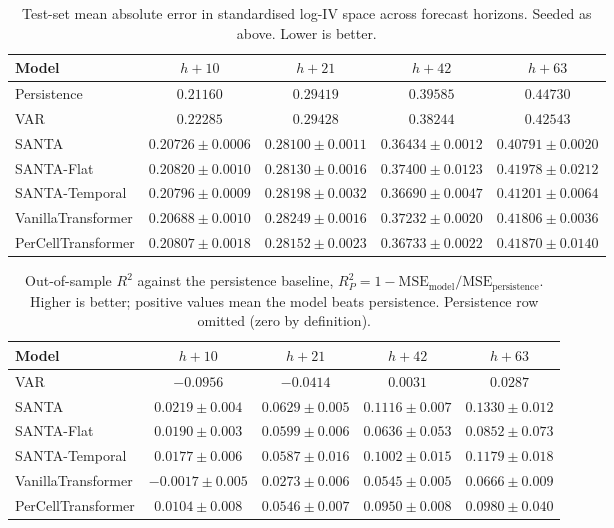 \begin{table}[h]
\centering
\caption{Test-set mean absolute error in standardised log-IV space across forecast horizons. Seeded as above. Lower is better.}
\label{tab:headline_mae}
\begin{tabular}{lcccc}
\toprule
Model & $h{+}10$ & $h{+}21$ & $h{+}42$ & $h{+}63$ \\
\midrule
Persistence            & $0.21160$ & $0.29419$ & $0.39585$ & $0.44730$ \\
VAR                    & $0.22285$ & $0.29428$ & $0.38244$ & $0.42543$ \\
\midrule
SANTA                  & $0.20726 \pm 0.0006$ & $\mathbf{0.28100 \pm 0.0011}$ & $\mathbf{0.36434 \pm 0.0012}$ & $\mathbf{0.40791 \pm 0.0020}$ \\
SANTA-Flat             & $0.20820 \pm 0.0010$ & $0.28130 \pm 0.0016$ & $0.37400 \pm 0.0123$ & $0.41978 \pm 0.0212$ \\
SANTA-Temporal         & $0.20796 \pm 0.0009$ & $0.28198 \pm 0.0032$ & $0.36690 \pm 0.0047$ & $0.41201 \pm 0.0064$ \\
\midrule
VanillaTransformer     & $\mathbf{0.20688 \pm 0.0010}$ & $0.28249 \pm 0.0016$ & $0.37232 \pm 0.0020$ & $0.41806 \pm 0.0036$ \\
PerCellTransformer     & $0.20807 \pm 0.0018$ & $0.28152 \pm 0.0023$ & $0.36733 \pm 0.0022$ & $0.41870 \pm 0.0140$ \\
\bottomrule
\end{tabular}
\end{table}

\begin{table}[h]
\centering
\caption{Out-of-sample $R^2$ against the persistence baseline, $R^2_P = 1 - \mathrm{MSE}_\text{model}/\mathrm{MSE}_\text{persistence}$. Higher is better; positive values mean the model beats persistence. Persistence row omitted (zero by definition).}
\label{tab:headline_r2_pers}
\begin{tabular}{lcccc}
\toprule
Model & $h{+}10$ & $h{+}21$ & $h{+}42$ & $h{+}63$ \\
\midrule
VAR                    & $-0.0956$ & $-0.0414$ & $0.0031$ & $0.0287$ \\
\midrule
SANTA                  & $\mathbf{0.0219 \pm 0.004}$ & $\mathbf{0.0629 \pm 0.005}$ & $\mathbf{0.1116 \pm 0.007}$ & $\mathbf{0.1330 \pm 0.012}$ \\
SANTA-Flat             & $0.0190 \pm 0.003$ & $0.0599 \pm 0.006$ & $0.0636 \pm 0.053$ & $0.0852 \pm 0.073$ \\
SANTA-Temporal         & $0.0177 \pm 0.006$ & $0.0587 \pm 0.016$ & $0.1002 \pm 0.015$ & $0.1179 \pm 0.018$ \\
\midrule
VanillaTransformer     & $-0.0017 \pm 0.005$ & $0.0273 \pm 0.006$ & $0.0545 \pm 0.005$ & $0.0666 \pm 0.009$ \\
PerCellTransformer     & $0.0104 \pm 0.008$ & $0.0546 \pm 0.007$ & $0.0950 \pm 0.008$ & $0.0980 \pm 0.040$ \\
\bottomrule
\end{tabular}
\end{table}

